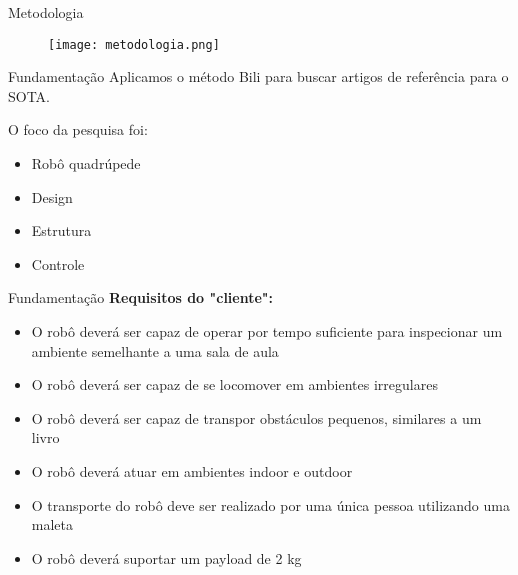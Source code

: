 \begin{frame}[t]{Metodologia}
    \begin{figure}
        \texttt{[image: metodologia.png]}
    \end{figure}
\end{frame}

\begin{frame}[t]{Fundamentação}
    Aplicamos o método Bili para buscar artigos de referência para o SOTA.

    O foco da pesquisa foi:
    \begin{itemize}
        \item Robô quadrúpede
        \item Design
        \item Estrutura
        \item Controle
    \end{itemize}


\end{frame}

\begin{frame}[t]{Fundamentação}
    \textbf{Requisitos do "cliente":}
    \begin{itemize}
        \item O robô deverá ser capaz de operar por tempo suficiente para inspecionar um ambiente semelhante a uma sala de aula
        \item O robô deverá ser capaz de se locomover em ambientes irregulares
        \item O robô deverá ser capaz de transpor obstáculos pequenos, similares a um livro
        \item O robô deverá atuar em ambientes indoor e outdoor
        \item O transporte do robô deve ser realizado por uma única pessoa utilizando uma maleta
        \item O robô deverá suportar um payload de 2 kg
    \end{itemize}

\end{frame}

